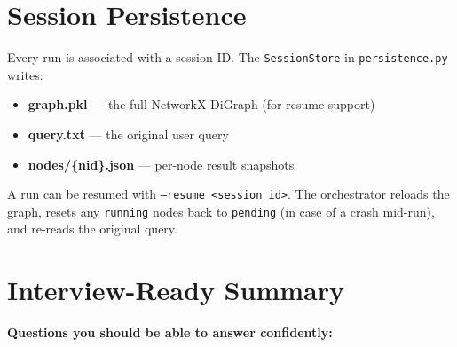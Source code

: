\documentclass[12pt,a4paper]{article}
\begin{document}
\section{Session Persistence}

Every run is associated with a session ID. The \texttt{SessionStore} in
\texttt{persistence.py} writes:

\begin{itemize}[noitemsep]
  \item \textbf{graph.pkl} — the full NetworkX DiGraph (for resume support)
  \item \textbf{query.txt} — the original user query
  \item \textbf{nodes/\{nid\}.json} — per-node result snapshots
\end{itemize}

A run can be resumed with \texttt{--resume <session\_id>}. The orchestrator
reloads the graph, resets any \texttt{running} nodes back to \texttt{pending}
(in case of a crash mid-run), and re-reads the original query.

\section{Interview-Ready Summary}

\begin{notebox}
\textbf{Questions you should be able to answer confidently:}
\end{notebox}
\end{document}
